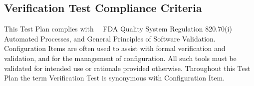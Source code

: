 \subsection{Verification Test Compliance Criteria}
This Test Plan complies with \sopSDLC\, \sopSCM\, FDA Quality System Regulation
820.70(i) Automated Processes, and General Principles of Software Validation.
Configuration Items are often used to assist with formal verification and
validation, and for the management of configuration.  All such tools must be
validated for intended use or rationale provided otherwise.  Throughout this
Test Plan the term Verification Test is synonymous with Configuration
Item.
